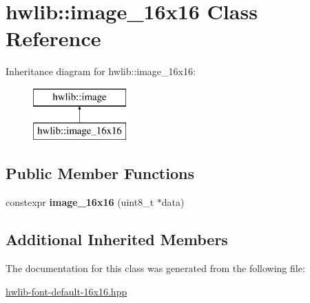 \hypertarget{classhwlib_1_1image__16x16}{}\section{hwlib\+:\+:image\+\_\+16x16 Class Reference}
\label{classhwlib_1_1image__16x16}
Inheritance diagram for hwlib\+:\+:image\+\_\+16x16\+:\begin{figure}[H]
\begin{center}
\leavevmode
\includegraphics[height=2.000000cm]{classhwlib_1_1image__16x16}
\end{center}
\end{figure}
\subsection*{Public Member Functions}
\begin{DoxyCompactItemize}
\item 
constexpr {\bfseries image\+\_\+16x16} (uint8\+\_\+t $\ast$data)\hypertarget{classhwlib_1_1image__16x16_a55d9a91ab23947cfe7068042400b365a}{}\label{classhwlib_1_1image__16x16_a55d9a91ab23947cfe7068042400b365a}

\end{DoxyCompactItemize}
\subsection*{Additional Inherited Members}


The documentation for this class was generated from the following file\+:\begin{DoxyCompactItemize}
\item 
\hyperlink{hwlib-font-default-16x16_8hpp}{hwlib-\/font-\/default-\/16x16.\+hpp}\end{DoxyCompactItemize}
